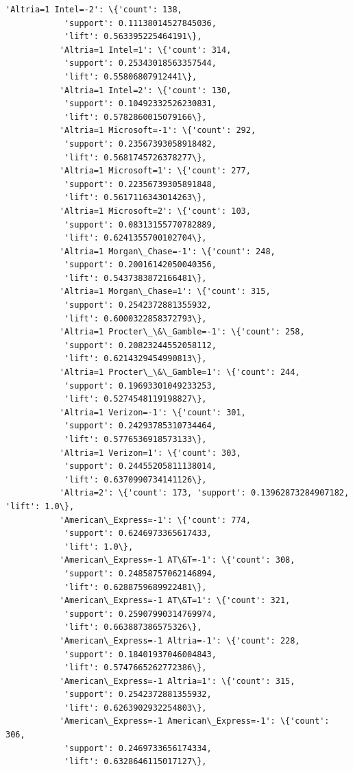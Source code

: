 \documentclass[11pt]{article}
\begin{document}
\begin{Verbatim}[commandchars=\\\{\}]
           'Altria=1 Intel=-2': \{'count': 138,
            'support': 0.11138014527845036,
            'lift': 0.563395225464191\},
           'Altria=1 Intel=1': \{'count': 314,
            'support': 0.25343018563357544,
            'lift': 0.55806807912441\},
           'Altria=1 Intel=2': \{'count': 130,
            'support': 0.10492332526230831,
            'lift': 0.5782860015079166\},
           'Altria=1 Microsoft=-1': \{'count': 292,
            'support': 0.23567393058918482,
            'lift': 0.5681745726378277\},
           'Altria=1 Microsoft=1': \{'count': 277,
            'support': 0.22356739305891848,
            'lift': 0.5617116343014263\},
           'Altria=1 Microsoft=2': \{'count': 103,
            'support': 0.08313155770782889,
            'lift': 0.6241355700102704\},
           'Altria=1 Morgan\_Chase=-1': \{'count': 248,
            'support': 0.20016142050040356,
            'lift': 0.5437383872166481\},
           'Altria=1 Morgan\_Chase=1': \{'count': 315,
            'support': 0.2542372881355932,
            'lift': 0.6000322858372793\},
           'Altria=1 Procter\_\&\_Gamble=-1': \{'count': 258,
            'support': 0.20823244552058112,
            'lift': 0.6214329454990813\},
           'Altria=1 Procter\_\&\_Gamble=1': \{'count': 244,
            'support': 0.19693301049233253,
            'lift': 0.5274548119198827\},
           'Altria=1 Verizon=-1': \{'count': 301,
            'support': 0.24293785310734464,
            'lift': 0.5776536918573133\},
           'Altria=1 Verizon=1': \{'count': 303,
            'support': 0.24455205811138014,
            'lift': 0.6370990734141126\},
           'Altria=2': \{'count': 173, 'support': 0.13962873284907182, 'lift': 1.0\},
           'American\_Express=-1': \{'count': 774,
            'support': 0.6246973365617433,
            'lift': 1.0\},
           'American\_Express=-1 AT\&T=-1': \{'count': 308,
            'support': 0.24858757062146894,
            'lift': 0.6288759689922481\},
           'American\_Express=-1 AT\&T=1': \{'count': 321,
            'support': 0.25907990314769974,
            'lift': 0.663887386575326\},
           'American\_Express=-1 Altria=-1': \{'count': 228,
            'support': 0.18401937046004843,
            'lift': 0.5747665262772386\},
           'American\_Express=-1 Altria=1': \{'count': 315,
            'support': 0.2542372881355932,
            'lift': 0.6263902932254803\},
           'American\_Express=-1 American\_Express=-1': \{'count': 306,
            'support': 0.2469733656174334,
            'lift': 0.6328646115017127\},

\end{Verbatim}
\end{document}

